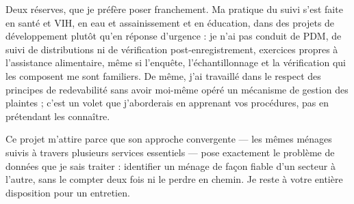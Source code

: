 \documentclass[10pt,a4paper,sans]{moderncv}
\begin{document}
Deux réserves, que je préfère poser franchement. Ma pratique du suivi s'est faite en santé et VIH, en eau et assainissement et en éducation, dans des projets de développement plutôt qu'en réponse d'urgence : je n'ai pas conduit de PDM, de suivi de distributions ni de vérification post-enregistrement, exercices propres à l'assistance alimentaire, même si l'enquête, l'échantillonnage et la vérification qui les composent me sont familiers. De même, j'ai travaillé dans le respect des principes de redevabilité sans avoir moi-même opéré un mécanisme de gestion des plaintes ; c'est un volet que j'aborderais en apprenant vos procédures, pas en prétendant les connaître.

Ce projet m'attire parce que son approche convergente --- les mêmes ménages suivis à travers plusieurs services essentiels --- pose exactement le problème de données que je sais traiter : identifier un ménage de façon fiable d'un secteur à l'autre, sans le compter deux fois ni le perdre en chemin. Je reste à votre entière disposition pour un entretien.

\makeletterclosing
\end{document}
